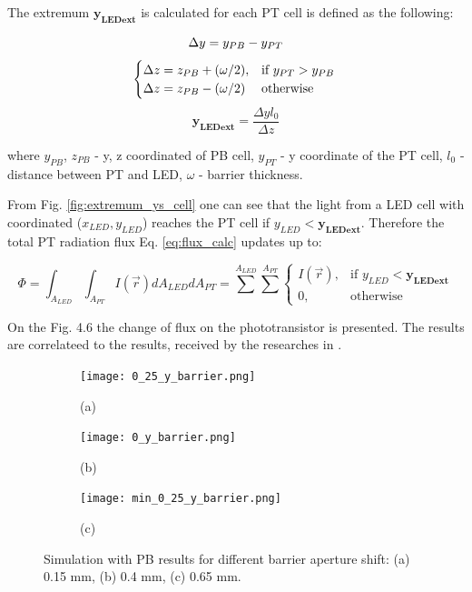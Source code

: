 The extremum $\boldsymbol{y_{\text{LED}ext}}$ is calculated for each PT cell is defined as the following:

$$
  \Delta y = y_{PB} - y_{PT}\\
$$
$$
  \begin{cases}
    \Delta z = z_{PB} + (\omega / 2), &  \text{if }y_{PT} > y_{PB}\\
    \Delta z = z_{PB} - (\omega / 2)  & \text{otherwise}
  \end{cases}\\
$$
$$
  \boldsymbol{y_{\text{LED}ext}} = \frac{\Delta y  l_0}{\Delta z}
$$

where $y_{PB}$, $z_{PB}$ - y, z coordinated of PB cell, 
$y_{PT}$ - y coordinate of the PT cell,
$l_0$ - distance between PT and LED,
$\omega$ - barrier thickness.

From Fig. \ref{fig:extremum_ys_cell} one can see that the light from a LED cell with coordinated ($ x_{LED}, y_{LED}$) reaches the PT cell if $y_{LED} < \boldsymbol{y_{\text{LED}ext}}$.
Therefore the total PT radiation flux Eq. \ref{eq:flux_calc} updates up to:

\begin{equation}
  \Phi = \int_{A_{LED}} \int_{A_{PT}} I(\vec{r})d A_{LED} d A_{PT} = \sum_{}^{A_{LED}} \sum_{}^{A_{PT}} \begin{cases}
    I(\vec{r}), & \text{if }y_{LED} < \boldsymbol{y_{\text{LED}ext}}\\
    0, & \text{otherwise}
  \end{cases}
  \label{eq:flux}
\end{equation}

On the Fig. 4.6 the change of flux on the phototransistor is presented. The results are correlateed to the results, received by the researches in 
\cite{my_love_pressure_photosensor}.

\begin{figure}[H]
  \centering
  \begin{subfigure}[b]{0.4\textwidth}
    \texttt{[image: 0\_25\_y\_barrier.png]}
    \centering
    \label{fig:0_25_y_barrier}
    \caption*{(a)}
  \end{subfigure}
  \begin{subfigure}[b]{0.4\textwidth}
    \texttt{[image: 0\_y\_barrier.png]}
    \label{fig:0_y_barrier}
    \caption*{(b)}
  \end{subfigure}
  \begin{subfigure}[b]{0.4\textwidth}
    \texttt{[image: min\_0\_25\_y\_barrier.png]}
    \label{fig:min_0_25_y_barrier}
    \caption*{(c)}
  \end{subfigure}
  \label{fig:LED_PT_simulation_vs_bar}
  \caption{Simulation with PB results for different barrier aperture shift: (a) 0.15 mm, (b) 0.4 mm, (c) 0.65 mm.}
\end{figure}